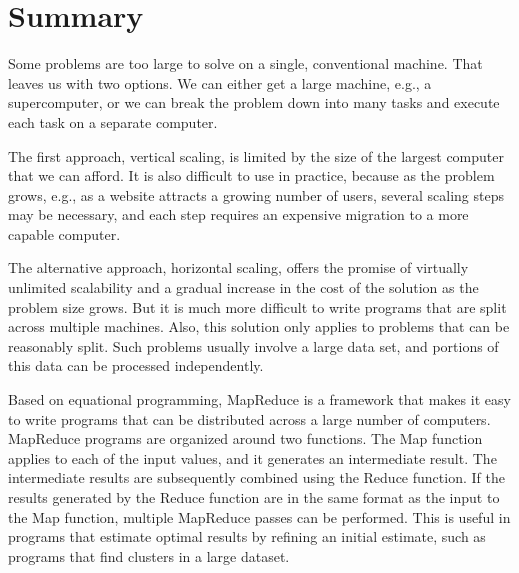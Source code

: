 \section{Summary}

Some problems are too large to solve on a single, conventional machine.  That leaves us
with two options.  We can either get a large machine, e.g., a supercomputer, or we can
break the problem down into many tasks and execute each task on a separate computer.

The first approach, vertical scaling, is limited by the size of the largest computer that
we can afford.  It is also difficult to use in practice, because as the problem grows,
e.g., as a website attracts a growing number of users, several scaling steps may be
necessary, and each step requires an expensive migration to a more capable computer.

The alternative approach, horizontal scaling, offers the promise of virtually unlimited
scalability and a gradual increase in the cost of the solution as the problem size grows.
But it is much more difficult to write programs that are split across multiple machines.
Also, this solution only applies to problems that can be reasonably split.  Such problems
usually involve a large data set, and portions of this data can be processed independently.

Based on equational programming, MapReduce is a framework that makes it easy to write
programs that can be distributed across a large number of computers.  MapReduce programs are
organized around two functions.  The Map function applies to each of the input values, and
it generates an intermediate result.  The intermediate results are subsequently combined using
the Reduce function.  If the results generated by the Reduce function are in the same format
as the input to the Map function, multiple MapReduce passes can be performed.  This is useful
in programs that estimate optimal results by refining an initial estimate, such as programs that
find clusters in a large dataset.

